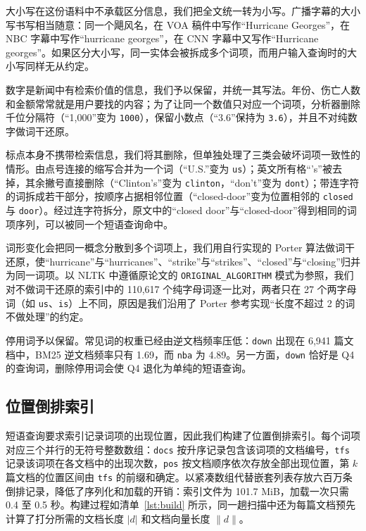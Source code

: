 \documentclass[12pt,a4paper]{ctexart}
\begin{document}
大小写在这份语料中不承载区分信息，我们把全文统一转为小写。广播字幕的大小写书写相当随意：同一个飓风名，在 VOA 稿件中写作“Hurricane Georges”，在 NBC 字幕中写作“hurricane georges”，在 CNN 字幕中又写作“Hurricane georges”。如果区分大小写，同一实体会被拆成多个词项，而用户输入查询时的大小写同样无从约定。

数字是新闻中有检索价值的信息，我们予以保留，并统一其写法。年份、伤亡人数和金额常常就是用户要找的内容；为了让同一个数值只对应一个词项，分析器删除千位分隔符（“1,000”变为 \texttt{1000}），保留小数点（“3.6”保持为 \texttt{3.6}），并且不对纯数字做词干还原。

标点本身不携带检索信息，我们将其删除，但单独处理了三类会破坏词项一致性的情形。由点号连接的缩写合并为一个词（“U.S.”变为 \texttt{us}）；英文所有格“'s”被去掉，其余撇号直接删除（“Clinton's”变为 \texttt{clinton}，“don't”变为 \texttt{dont}）；带连字符的词拆成若干部分，按顺序占据相邻位置（“closed-door”变为位置相邻的 \texttt{closed} 与 \texttt{door}）。经过连字符拆分，原文中的“closed door”与“closed-door”得到相同的词项序列，可以被同一个短语查询命中。

词形变化会把同一概念分散到多个词项上，我们用自行实现的 Porter 算法做词干还原，使“hurricane”与“hurricanes”、“strike”与“strikes”、“closed”与“closing”归并为同一词项。以 NLTK 中遵循原论文的 \texttt{ORIGINAL\_\allowbreak ALGORITHM} 模式为参照，我们对不做词干还原的索引中的 110,617 个纯字母词逐一比对，两者只在 27 个两字母词（如 \texttt{us}、\texttt{is}）上不同，原因是我们沿用了 Porter 参考实现“长度不超过 2 的词不做处理”的约定。

停用词予以保留。常见词的权重已经由逆文档频率压低：\texttt{down} 出现在 6,941 篇文档中，BM25 逆文档频率只有 1.69，而 \texttt{nba} 为 4.89。另一方面，\texttt{down} 恰好是 Q4 的查询词，删除停用词会使 Q4 退化为单纯的短语查询。

\subsection{位置倒排索引}

短语查询要求索引记录词项的出现位置，因此我们构建了位置倒排索引。每个词项对应三个并行的无符号整数数组：\texttt{docs} 按升序记录包含该词项的文档编号，\texttt{tfs} 记录该词项在各文档中的出现次数，\texttt{pos} 按文档顺序依次存放全部出现位置，第 $k$ 篇文档的位置区间由 \texttt{tfs} 的前缀和确定。以紧凑数组代替嵌套列表存放六百万条倒排记录，降低了序列化和加载的开销：索引文件为 101.7 MiB，加载一次只需 0.4 至 0.5 秒。构建过程如清单~\ref{lst:build} 所示，同一趟扫描中还为每篇文档预先计算了打分所需的文档长度 $|d|$ 和文档向量长度 $\lVert d \rVert$。
\end{document}
